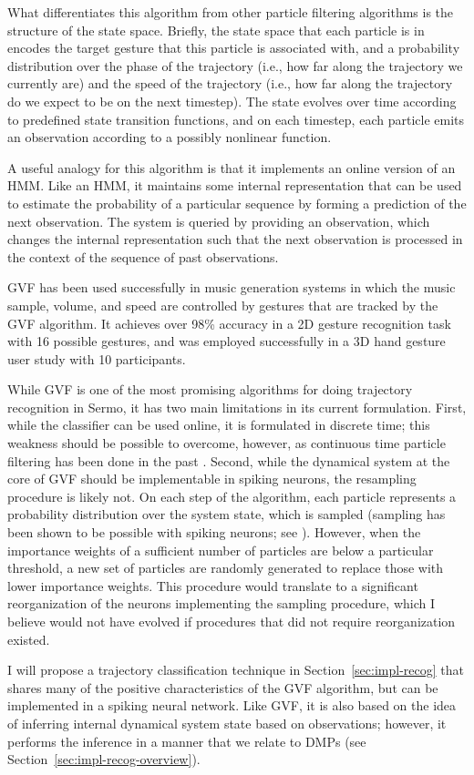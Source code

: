 What differentiates this algorithm from
other particle filtering algorithms
is the structure of the state space.
Briefly, the state space that each particle is in
encodes the target gesture that this particle
is associated with,
and a probability distribution
over the phase of the trajectory
(i.e., how far along the trajectory
we currently are)
and the speed of the trajectory
(i.e., how far along the trajectory
do we expect to be on the next timestep).
The state evolves over time according to
predefined state transition functions,
and on each timestep,
each particle emits an observation
according to a possibly nonlinear function.

A useful analogy for this algorithm
is that it implements an online version of an HMM.
Like an HMM, it maintains some internal representation
that can be used to estimate the probability
of a particular sequence
by forming a prediction
of the next observation.
The system is queried by providing
an observation,
which changes the internal representation
such that the next observation
is processed in the context of
the sequence of past observations.

GVF has been used successfully
in music generation systems
in which the music sample,
volume, and speed are
controlled by gestures
that are tracked by the GVF algorithm.
It achieves over 98\% accuracy
in a 2D gesture recognition task
with 16 possible gestures,
and was employed successfully
in a 3D hand gesture user study
with 10 participants.

While GVF is one of the most promising
algorithms for doing trajectory recognition
in Sermo,
it has two main limitations in its current formulation.
First, while the classifier can be used online,
it is formulated in discrete time;
this weakness should be possible to overcome,
however, as continuous time particle filtering
has been done in the past
\citep{ng2005}.
Second, while the dynamical system
at the core of GVF should be
implementable in spiking neurons,
the resampling procedure is likely not.
On each step of the algorithm,
each particle represents a probability
distribution over the system state,
which is sampled
(sampling has been shown to be
possible with spiking neurons;
see \citealt{buesing2011}).
However, when the importance weights
of a sufficient number of particles
are below a particular threshold,
a new set of particles
are randomly generated
to replace those with lower importance weights.
This procedure would translate to
a significant reorganization
of the neurons implementing
the sampling procedure,
which I believe
would not have evolved if
procedures that did not require
reorganization existed.

I will propose a trajectory classification technique
in Section~\ref{sec:impl-recog}
that shares many of the positive
characteristics of the GVF algorithm,
but can be implemented in a spiking neural network.
Like GVF, it is also based on the idea
of inferring internal dynamical system state
based on observations;
however, it performs the inference
in a manner that we relate to
DMPs (see Section~\ref{sec:impl-recog-overview}).
